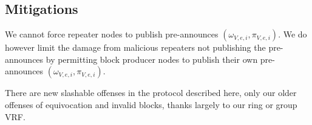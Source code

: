 \subsection{Mitigations}\label{subsec:slashing}

We cannot force repeater nodes to publish pre-announces $(\omega_{V,e,i},\pi_{V,e,i})$.  We do however limit the damage from malicious repeaters not publishing the pre-announces by permitting block producer nodes to publish their own pre-announces $(\omega_{V,e,i},\pi_{V,e,i})$.  

There are new slashable offenses in the protocol described here, only our older offenses of equivocation and invalid blocks, thanks largely to our ring or group VRF.  






